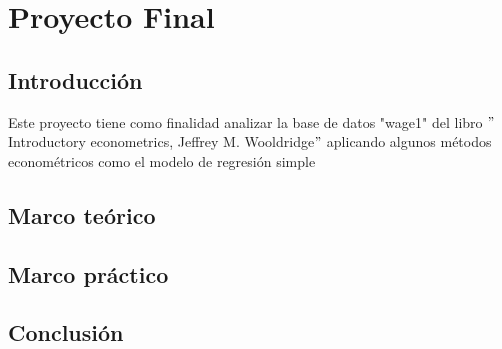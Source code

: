 \chapter{Proyecto Final}

\begin{multicols}{2}

\section{Introducción}
Este proyecto tiene como finalidad analizar la base de datos "wage1"  del libro $"$Introductory econometrics, Jeffrey M. Wooldridge$"$  aplicando algunos métodos econométricos como el modelo de regresión simple
\section{Marco teórico}

\section{Marco práctico}
\section{Conclusión}

\end{multicols}

